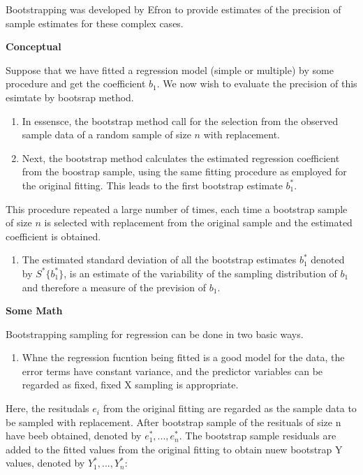 \documentclass[]{book}
\providecommand{\tightlist}{%
  \setlength{\itemsep}{0pt}\setlength{\parskip}{0pt}}
\begin{document}
Bootstrapping was developed by Efron to provide estimates of the precision of sample estimates for these complex cases.

\textbf{Conceptual}

Suppose that we have fitted a regression model (simple or multiple) by some procedure and get the coefficient \(b_1\). We now wish to evaluate the precision of this esimtate by bootsrap method.

\begin{enumerate}
\def\labelenumi{(\arabic{enumi})}
\item
  In essensce, the bootstrap method call for the selection from the observed sample data of a random sample of size \(n\) with replacement.
\item
  Next, the bootstrap method calculates the estimated regression coefficient from the boostrap sample, using the same fitting procedure as employed for the original fitting. This leads to the first bootstrap estimate \(b_1^*\).
\end{enumerate}

This procedure repeated a large number of times, each time a bootstrap sample of size \(n\) is selected with replacement from the original sample and the estimated coefficient is obtained.

\begin{enumerate}
\def\labelenumi{(\arabic{enumi})}
\setcounter{enumi}{2}
\tightlist
\item
  The estimated standard deviation of all the bootstrap estimates \(b_1^*\) denoted by \(S^*\{b_1^*\}\), is an estimate of the variability of the sampling distribution of \(b_1\) and therefore a measure of the prevision of \(b_1\).
\end{enumerate}

\textbf{Some Math}

Bootstrapping sampling for regression can be done in two basic ways.

\begin{enumerate}
\def\labelenumi{(\arabic{enumi})}
\tightlist
\item
  Whne the regression fucntion being fitted is a good model for the data, the error terms have constant variance, and the predictor variables can be regarded as fixed, fixed X sampling is appropriate.
\end{enumerate}

Here, the resitudals \(e_i\) from the original fitting are regarded as the sample data to be sampled with replacement. After bootstrap sample of the resituals of size n have beeb obtained, denoted by \(e_1^*, ..., e_n^*\). The bootstrap sample residuals are added to the fitted values from the original fitting to obtain nuew bootstrap Y values, denoted by \(Y_1^*,...,Y_n^*\):
\end{document}
